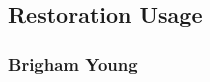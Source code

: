 \subsection{Restoration Usage} %
	\label{CATS-RESTORATION}

	
		
	
	
	\subsubsection{Brigham Young} %
		\label{CATS-BY}
	
